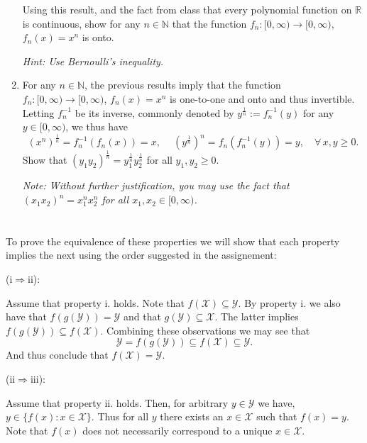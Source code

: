 \documentclass[12 pt,letterpaper]{article}
\newcommand{\bbN}{\mathbb{N}}
\newcommand{\bbR}{\mathbb{R}}
\begin{document}
\begin{enumerate}
Using this result,
and the fact from class that every polynomial function on $\bbR$ is continuous,
show for any $n\in\bbN$ that the function $f_n:[0,\infty)\rightarrow[0,\infty)$, $f_n(x)=x^n$ is onto.

\textit{Hint: Use Bernoulli's inequality.}

\item
For any $n\in\bbN$, the previous results imply that the function $f_n:[0,\infty)\rightarrow[0,\infty)$, $f_n(x)=x^n$ is one-to-one and onto and thus invertible.
Letting $f_n^{-1}$ be its inverse,
commonly denoted by $y^{\frac1n}:=f_n^{-1}(y)$ for any $y\in[0,\infty)$,
we thus have
\begin{equation*}
(x^n)^{\frac1n}=f_n^{-1}(f_n(x))=x,\
\quad
(y^{\frac1n})^n=f_n(f_n^{-1}(y))=y,
\quad\forall\,x,y\geq 0.
\end{equation*}
Show that $(y_1y_2)^{\frac1n}=y_1^{\frac1n}y_2^{\frac1n}$ for all $y_1,y_2\geq0$.

\textit{Note: Without further justification, you may use the fact that
$(x_1x_2)^n=x_1^n x_2^n$ for all $x_1,x_2\in[0,\infty)$.}

\end{enumerate}

\parskip=5pt

\clearpage
\section{}
To prove the equivalence of these properties we will show that each property implies the 
next using the order suggested in the assignement:

\noindent
(i\(\Rightarrow\)ii):

Assume that property i. holds.
Note that \(f(\mathcal{X})\subseteq\mathcal{Y}\).
By property i. we also have that \(f(g(\mathcal{Y}))=\mathcal{Y}\)
and that \(g(\mathcal{Y})\subseteq\mathcal{X}\).
The latter implies \(f(g(\mathcal{Y}))\subseteq f(\mathcal{X})\).
Combining these observations we may see that
\[\mathcal{Y} = f(g(\mathcal{Y})) \subseteq f(\mathcal{X}) \subseteq \mathcal{Y}.\]
And thus conclude that \(f(\mathcal{X})=\mathcal{Y}\).

\vspace{5pt}\noindent
(ii\(\Rightarrow\)iii):

Assume that property ii. holds.
Then, for arbitrary \(y\in\mathcal{Y}\) we have, \(y\in\{f(x):x\in\mathcal{X}\}\).
Thus for all \(y\) there exists an \(x\in\mathcal{X}\) such that \(f(x) = y\).
Note that \(f(x)\) does not necessarily correspond to a unique \(x\in\mathcal{X}\).
\end{document}

